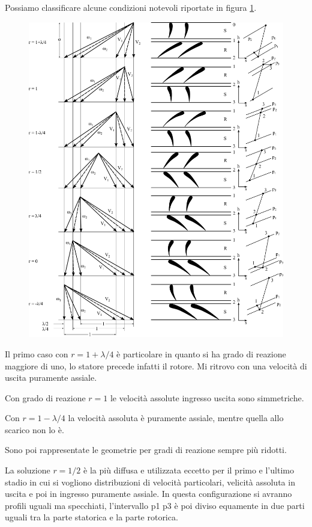Possiamo classificare alcune condizioni notevoli riportate in figura \ref{fig:ComprAssTab}.
\begin{figure}
\centering
  \includegraphics[width=1.2\textwidth]{fig/ComprAssTab.pdf}
\caption{}
\label{fig:ComprAssTab}
\end{figure}
Il primo caso con $r = 1 + \lambda /4$ è particolare in quanto si ha grado di reazione maggiore di uno, lo statore precede infatti il rotore. Mi ritrovo con una velocità di uscita puramente assiale.

Con grado di reazione $r = 1$ le velocità assolute ingresso uscita sono simmetriche.

Con $r = 1 - \lambda/4$ la velocità assoluta è puramente assiale, mentre quella allo scarico non lo è. 

Sono poi rappresentate le geometrie per gradi di reazione sempre più ridotti. 

La soluzione $r = 1/2$ è la più diffusa e utilizzata eccetto per il primo e l'ultimo stadio in cui si vogliono distribuzioni di velocità particolari, velicità assoluta in uscita e poi in ingresso puramente assiale. In questa configurazione si avranno profili uguali ma specchiati, l'intervallo p1 p3 è poi diviso equamente in due parti uguali tra la parte statorica e la parte rotorica. 

